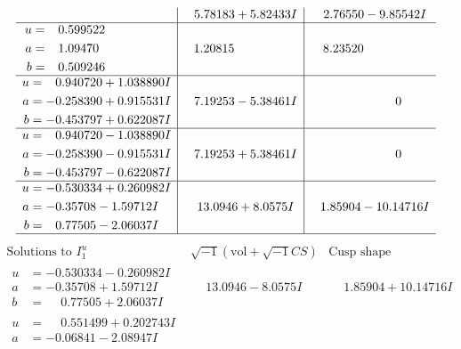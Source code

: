 \documentclass[1p]{elsarticle_modified}
\theoremstyle{definition}
\newcommand{\I}{\sqrt{-1}}
\begin{document}
$$\begin{array}{c|c|c}
 & \phantom{-}5.78183 + 5.82433 I & \phantom{-}2.76550 - 9.85542 I \\ \hline\begin{aligned}
u &= \phantom{-}0.599522\phantom{ +0.000000I} \\
a &= \phantom{-}1.09470\phantom{ +0.000000I} \\
b &= \phantom{-}0.509246\phantom{ +0.000000I}\end{aligned}
 & \phantom{-}1.20815\phantom{ +0.000000I} & \phantom{-}8.23520\phantom{ +0.000000I} \\ \hline\begin{aligned}
u &= \phantom{-}0.940720 + 1.038890 I \\
a &= -0.258390 + 0.915531 I \\
b &= -0.453797 + 0.622087 I\end{aligned}
 & \phantom{-}7.19253 - 5.38461 I & \phantom{-0.000000 } 0 \\ \hline\begin{aligned}
u &= \phantom{-}0.940720 - 1.038890 I \\
a &= -0.258390 - 0.915531 I \\
b &= -0.453797 - 0.622087 I\end{aligned}
 & \phantom{-}7.19253 + 5.38461 I & \phantom{-0.000000 } 0 \\ \hline\begin{aligned}
u &= -0.530334 + 0.260982 I \\
a &= -0.35708 - 1.59712 I \\
b &= \phantom{-}0.77505 - 2.06037 I\end{aligned}
 & \phantom{-}13.0946 + 8.0575 I & \phantom{-}1.85904 - 10.14716 I\\
 \hline 
 \end{array}$$\newpage$$\begin{array}{c|c|c}  
\text{Solutions to }I^u_{1}& \I (\text{vol} + \sqrt{-1}CS) & \text{Cusp shape}\\
 \hline 
\begin{aligned}
u &= -0.530334 - 0.260982 I \\
a &= -0.35708 + 1.59712 I \\
b &= \phantom{-}0.77505 + 2.06037 I\end{aligned}
 & \phantom{-}13.0946 - 8.0575 I & \phantom{-}1.85904 + 10.14716 I \\ \hline\begin{aligned}
u &= \phantom{-}0.551499 + 0.202743 I \\
a &= -0.06841 - 2.08947 I \\

\end{aligned}
\end{array}$$
\end{document}

